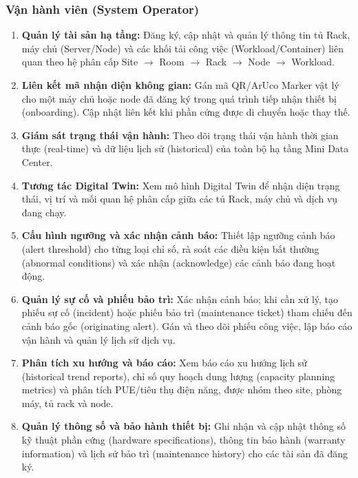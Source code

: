 \subsubsection{Vận hành viên (System Operator)}
\begin{enumerate}[label=\textbf{FO-\arabic*}., leftmargin=2.5em]
    \item \textbf{Quản lý tài sản hạ tầng:} Đăng ký, cập nhật và quản lý thông tin tủ Rack, máy chủ (Server/Node) và các khối tải công việc (Workload/Container) liên quan theo hệ phân cấp Site $\rightarrow$ Room $\rightarrow$ Rack $\rightarrow$ Node $\rightarrow$ Workload.
    \item \textbf{Liên kết mã nhận diện không gian:} Gán mã QR/ArUco Marker vật lý cho một máy chủ hoặc node đã đăng ký trong quá trình tiếp nhận thiết bị (onboarding). Cập nhật liên kết khi phần cứng được di chuyển hoặc thay thế.
    \item \textbf{Giám sát trạng thái vận hành:} Theo dõi trạng thái vận hành thời gian thực (real-time) và dữ liệu lịch sử (historical) của toàn bộ hạ tầng Mini Data Center.
    \item \textbf{Tương tác Digital Twin:} Xem mô hình Digital Twin để nhận diện trạng thái, vị trí và mối quan hệ phân cấp giữa các tủ Rack, máy chủ và dịch vụ đang chạy.
    \item \textbf{Cấu hình ngưỡng và xác nhận cảnh báo:} Thiết lập ngưỡng cảnh báo (alert threshold) cho từng loại chỉ số, rà soát các điều kiện bất thường (abnormal conditions) và xác nhận (acknowledge) các cảnh báo đang hoạt động.
    \item \textbf{Quản lý sự cố và phiếu bảo trì:} Xác nhận cảnh báo; khi cần xử lý, tạo phiếu sự cố (incident) hoặc phiếu bảo trì (maintenance ticket) tham chiếu đến cảnh báo gốc (originating alert). Gán và theo dõi phiếu công việc, lập báo cáo vận hành và quản lý lịch sử dịch vụ.
    \item \textbf{Phân tích xu hướng và báo cáo:} Xem báo cáo xu hướng lịch sử (historical trend reports), chỉ số quy hoạch dung lượng (capacity planning metrics) và phân tích PUE/tiêu thụ điện năng, được nhóm theo site, phòng máy, tủ rack và node.
    \item \textbf{Quản lý thông số và bảo hành thiết bị:} Ghi nhận và cập nhật thông số kỹ thuật phần cứng (hardware specifications), thông tin bảo hành (warranty information) và lịch sử bảo trì (maintenance history) cho các tài sản đã đăng ký.
\end{enumerate}


